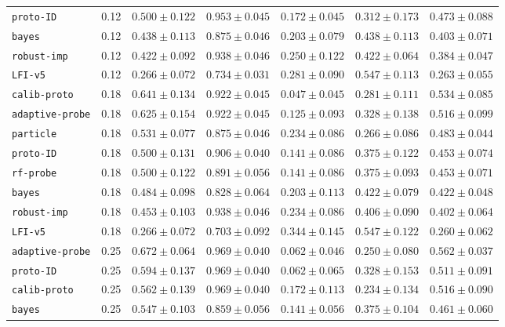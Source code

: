 \documentclass{article}
\begin{document}
\begin{center}
{\begin{tabular}{llccccc}
\texttt{proto-ID} & 0.12 & $0.500 \pm 0.122$ & $0.953 \pm 0.045$ & $0.172 \pm 0.045$ & $0.312 \pm 0.173$ & $0.473 \pm 0.088$ \\
\texttt{bayes} & 0.12 & $0.438 \pm 0.113$ & $0.875 \pm 0.046$ & $0.203 \pm 0.079$ & $0.438 \pm 0.113$ & $0.403 \pm 0.071$ \\
\texttt{robust-imp} & 0.12 & $0.422 \pm 0.092$ & $0.938 \pm 0.046$ & $0.250 \pm 0.122$ & $0.422 \pm 0.064$ & $0.384 \pm 0.047$ \\
\texttt{LFI-v5} & 0.12 & $0.266 \pm 0.072$ & $0.734 \pm 0.031$ & $0.281 \pm 0.090$ & $0.547 \pm 0.113$ & $0.263 \pm 0.055$ \\
\texttt{calib-proto} & 0.18 & $0.641 \pm 0.134$ & $0.922 \pm 0.045$ & $0.047 \pm 0.045$ & $0.281 \pm 0.111$ & $0.534 \pm 0.085$ \\
\texttt{adaptive-probe} & 0.18 & $0.625 \pm 0.154$ & $0.922 \pm 0.045$ & $0.125 \pm 0.093$ & $0.328 \pm 0.138$ & $0.516 \pm 0.099$ \\
\texttt{particle} & 0.18 & $0.531 \pm 0.077$ & $0.875 \pm 0.046$ & $0.234 \pm 0.086$ & $0.266 \pm 0.086$ & $0.483 \pm 0.044$ \\
\texttt{proto-ID} & 0.18 & $0.500 \pm 0.131$ & $0.906 \pm 0.040$ & $0.141 \pm 0.086$ & $0.375 \pm 0.122$ & $0.453 \pm 0.074$ \\
\texttt{rf-probe} & 0.18 & $0.500 \pm 0.122$ & $0.891 \pm 0.056$ & $0.141 \pm 0.086$ & $0.375 \pm 0.093$ & $0.453 \pm 0.071$ \\
\texttt{bayes} & 0.18 & $0.484 \pm 0.098$ & $0.828 \pm 0.064$ & $0.203 \pm 0.113$ & $0.422 \pm 0.079$ & $0.422 \pm 0.048$ \\
\texttt{robust-imp} & 0.18 & $0.453 \pm 0.103$ & $0.938 \pm 0.046$ & $0.234 \pm 0.086$ & $0.406 \pm 0.090$ & $0.402 \pm 0.064$ \\
\texttt{LFI-v5} & 0.18 & $0.266 \pm 0.072$ & $0.703 \pm 0.092$ & $0.344 \pm 0.145$ & $0.547 \pm 0.122$ & $0.260 \pm 0.062$ \\
\texttt{adaptive-probe} & 0.25 & $0.672 \pm 0.064$ & $0.969 \pm 0.040$ & $0.062 \pm 0.046$ & $0.250 \pm 0.080$ & $0.562 \pm 0.037$ \\
\texttt{proto-ID} & 0.25 & $0.594 \pm 0.137$ & $0.969 \pm 0.040$ & $0.062 \pm 0.065$ & $0.328 \pm 0.153$ & $0.511 \pm 0.091$ \\
\texttt{calib-proto} & 0.25 & $0.562 \pm 0.139$ & $0.969 \pm 0.040$ & $0.172 \pm 0.113$ & $0.234 \pm 0.134$ & $0.516 \pm 0.090$ \\
\texttt{bayes} & 0.25 & $0.547 \pm 0.103$ & $0.859 \pm 0.056$ & $0.141 \pm 0.056$ & $0.375 \pm 0.104$ & $0.461 \pm 0.060$ \\

\end{tabular}}
\end{center}
\end{document}
